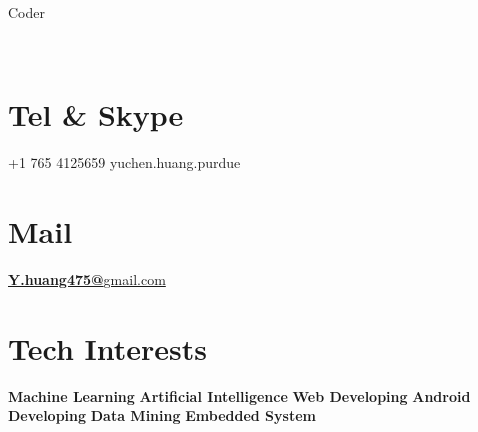 \documentclass[]{friggeri-cv}
\begin{document}
      {Coder}
      

\begin{aside}
    ~
  \section{Tel \& Skype}
    +1 765 4125659
    yuchen.huang.purdue
    ~
  \section{Mail}
    \href{mailto:y.huang475@gmail.com}{\textbf{Y.huang475@}{gmail.com}}
    ~
  \section{Tech Interests}
	\textbf{Machine Learning  }
	\textbf{Artificial Intelligence  }
	\textbf{Web Developing  }
	\textbf{Android Developing  }
	\textbf{Data Mining  }
	\textbf{Embedded System  }  	
	~  	

\end{aside}
\end{document}
